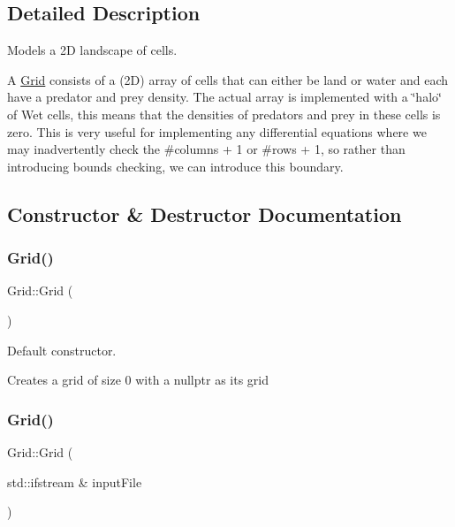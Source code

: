 \subsection{Detailed Description}
Models a 2D landscape of cells. 

A \hyperlink{class_grid}{Grid} consists of a (2D) array of cells that can either be land or water and each have a predator and prey density. The actual array is implemented with a \char`\"{}halo\char`\"{} of Wet cells, this means that the densities of predators and prey in these cells is zero. This is very useful for implementing any differential equations where we may inadvertently check the \#columns + 1 or \#rows + 1, so rather than introducing bounds checking, we can introduce this boundary. 

\subsection{Constructor \& Destructor Documentation}
\mbox{\label{class_grid_a4ac9ff4f63552b4c61ff90fcb35ad66c}} 
\subsubsection{\texorpdfstring{Grid()}{Grid()}\hspace{0.1cm}{\footnotesize\ttfamily [1/5]}}
{\footnotesize\ttfamily Grid\+::\+Grid (\begin{DoxyParamCaption}{ }\end{DoxyParamCaption})}



Default constructor. 

Creates a grid of size 0 with a nullptr as its grid \mbox{\label{class_grid_a88ab1ccc8100827b4da40e62b7b77e96}} 
\subsubsection{\texorpdfstring{Grid()}{Grid()}\hspace{0.1cm}{\footnotesize\ttfamily [2/5]}}
{\footnotesize\ttfamily Grid\+::\+Grid (\begin{DoxyParamCaption}\item[{std\+::ifstream \&}]{input\+File }\end{DoxyParamCaption})}



